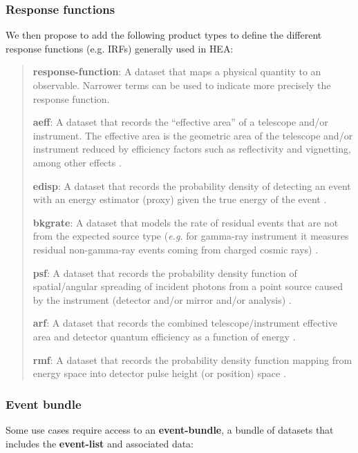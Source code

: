 \documentclass[11pt,a4paper]{ivoa}
\begin{document}
\subsubsection{Response functions}
\label{sec:responsefct}

We then propose to add the following product types to define the different response functions (e.g. \glspl{IRF}) generally used in \gls{HEA}:

\begin{quote}
{\bf response-function}: A dataset that maps a physical quantity to an observable. Narrower terms can be used to indicate more precisely the response function.

{\bf aeff}: A dataset that records the ``effective area'' of a telescope and/or instrument.  The effective area is the geometric area of the telescope and/or instrument reduced by efficiency factors such as reflectivity and vignetting, among other effects \citep{deil_2022_7304668}.

{\bf edisp}: A dataset that records the probability density of detecting an event with an energy estimator (proxy) given the true energy of the event \citep{deil_2022_7304668}.

{\bf bkgrate}: A dataset that models the rate of residual events that are not from the expected source type ({\em e.g.\/} for gamma-ray instrument it measures residual non-gamma-ray events coming from charged cosmic rays)  \citep{deil_2022_7304668}.

{\bf psf}: A dataset that records the probability density function of spatial/angular spreading of incident photons from a point source caused by the instrument (detector and/or mirror and/or analysis) \citep{deil_2022_7304668, ogip_psf_2011}.

{\bf arf}: A dataset that records the combined telescope/instrument effective area and detector quantum efficiency as a function of energy \citep{ogip_spectrum_1998}.

{\bf rmf}: A dataset that records the probability density function mapping from energy space into detector pulse height (or position) space \citep{ogip_spectrum_1998}.
\end{quote}

\subsubsection{Event bundle}

Some use cases  require access to an {\bf event-bundle}, a bundle of datasets that includes the {\bf event-list} and associated  data:
\end{document}

